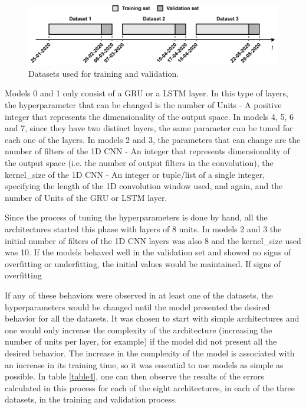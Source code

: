 \begin{figure}[h!]
    \centering
    \begin{center}
    \includegraphics[width=1\textwidth]{Images/hyptun.png}
    \caption{Datasets used for training and validation.}
    \label{hyptun}
    \end{center}
\end{figure}

Models 0 and 1 only consist of a \ac{GRU} or a \ac{LSTM} layer. In this type of layers, the hyperparameter that can be changed is the number of Units - A positive integer that represents the dimensionality of the output space. In models 4, 5, 6 and 7, since they have two distinct layers, the same parameter can be tuned for each one of the layers. In models 2 and 3, the parameters that can change are the number of filters of the \ac{1D CNN} - An integer that represents dimensionality of the output space (i.e. the number of output filters in the convolution), the kernel\_size of the \ac{1D CNN} - An integer or tuple/list of a single integer, specifying the length of the 1D convolution window used, and again, and the number of Units of the \ac{GRU} or \ac{LSTM} layer. 


Since the process of tuning the hyperparameters is done by hand, all the architectures started this phase with layers of 8 units. In models 2 and 3 the initial number of filters of the \ac{1D CNN} layers was also 8 and the kernel\_size used was 10. If the models behaved well in the validation set and showed no signs of overfitting or underfitting, the initial values would be maintained. If signs of overfitting 



If any of these behaviors were observed in at least one of the datasets, the hyperparameters would be changed until the model presented the desired behavior for all the datasets. It was chosen to start with simple architectures and one would only increase the complexity of the architecture (increasing the number of units per layer, for example) if the model did not present all the desired behavior. The increase in the complexity of the model is associated with an increase in its training time, so it was essential to use models as simple as possible. In table \ref{table4}, one can then observe the results of the errors calculated in this process for each of the eight architectures, in each of the three datasets, in the training and validation process.


